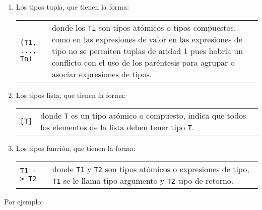       \begin{enumerate}
         \item Los tipos tupla, que tienen la forma:
            \begin{longtable}[c]{ll}
               \texttt{(T1, ..., Tn)} &
               \begin{minipage}{10cm}
                  donde los \texttt{Ti} son tipos atómicos o tipos compuestos, como en las expresiones de valor en las expresiones de tipo no se permiten tuplas de aridad 1 pues habría un conflicto con el uso de los paréntesis para agrupar o asociar expresiones de tipos.
               \end{minipage}
            \end{longtable}
         \item Los tipos lista, que tienen la forma:
            \begin{longtable}[c]{ll}
               \texttt{[T]} &
               \begin{minipage}{10cm}
                  donde \texttt{T} es un tipo atómico o       compuesto, indica que todos los elementos de la lista deben tener tipo \texttt{T}.
               \end{minipage}
            \end{longtable}
         \item Los tipos función, que tienen la forma:
            \begin{longtable}[c]{ll}
               \texttt{T1 ->~T2} &
               \begin{minipage}{10cm}
                  donde \texttt{T1} y \texttt{T2} son tipos atómicos o expresiones de tipo, \texttt{T1} se le llama tipo argumento y \texttt{T2} tipo de retorno.
               \end{minipage}
            \end{longtable}
      \end{enumerate}
      
      Por ejemplo:
      
